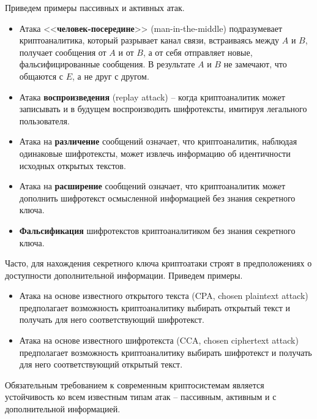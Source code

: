 Приведем примеры пассивных и активных атак.
\begin{itemize}
    \item Атака <<\textbf{человек-посередине}>> (man-in-the-middle) подразумевает криптоаналитика, который разрывает канал связи, встраиваясь между $A$ и $B$, получает сообщения от $A$ и от $B$, а от себя отправляет новые, фальсифицированные сообщения. В результате $A$ и $B$ не замечают, что общаются с $E$, а не друг с другом.
    \item Атака \textbf{воспроизведения} (replay attack) -- когда криптоаналитик может записывать и в будущем воспроизводить шифротексты, имитируя легального пользователя.
    \item Атака на \textbf{различение} сообщений означает, что криптоаналитик, наблюдая одинаковые шифротексты, может извлечь информацию об идентичности исходных открытых текстов.
    \item Атака на \textbf{расширение} сообщений означает, что криптоаналитик может дополнить шифротекст осмысленной информацией без знания секретного ключа.
    \item \textbf{Фальсификация} шифротекстов криптоаналитиком без знания секретного ключа.
\end{itemize}

Часто, для нахождения секретного ключа криптоатаки строят в предположениях о доступности дополнительной информации. Приведем примеры.
\begin{itemize}
    \item Атака на основе известного открытого текста (CPA, chosen plaintext attack) предполагает возможность криптоаналитику выбирать открытый текст и получать для него соответствующий шифротекст.
    \item Атака на основе известного шифротекста (CCA, chosen ciphertext attack) предполагает возможность криптоаналитику выбирать шифротекст и получать для него соответствующий открытый текст.
\end{itemize}

Обязательным требованием к современным криптосистемам является устойчивость ко всем известным типам атак -- пассивным, активным и с дополнительной информацией.


%


